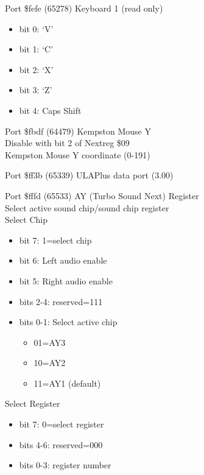 Port \$fefe (65278) Keyboard 1 (read only)
\begin{itemize}
\item[] bit 0: ‘V’
\item[] bit 1: ‘C’
\item[] bit 2: ‘X’
\item[] bit 3: ‘Z’
\item[] bit 4: Caps Shift
\end{itemize}

Port \$fbdf (64479) Kempston Mouse Y\\
Disable with bit 2 of Nextreg \$09\\
Kempston Mouse Y coordinate (0-191)

Port \$ff3b (65339) ULAPlus data port (3.00)

Port \$fffd (65533) AY (Turbo Sound Next) Register\\
Select active sound chip/sound chip register\\
Select Chip
\begin{itemize}
\item[] bit 7: 1=select chip
\item[] bit 6: Left audio enable
\item[] bit 5: Right audio enable
\item[] bits 2-4: reserved=111
\item[] bits 0-1: Select active chip
  \begin{itemize}
  \item[] 01=AY3
  \item[] 10=AY2
  \item[] 11=AY1 (default)
  \end{itemize}
\end{itemize}
 Select Register
\begin{itemize}
\item[] bit 7: 0=select register
\item[] bits 4-6: reserved=000
\item[] bits 0-3: register number
\end{itemize}
